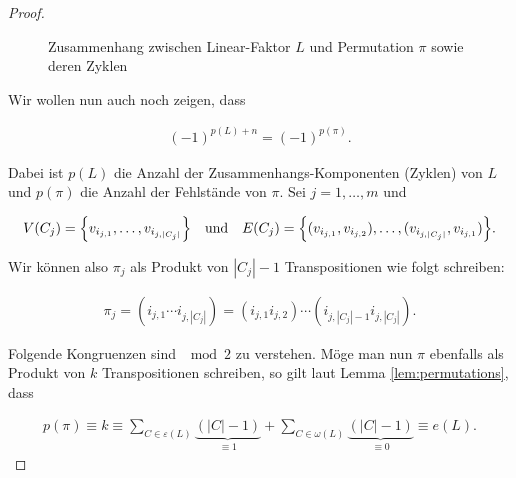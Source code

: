 \begin{proof}
\begin{figure}[h!]

                \caption{Zusammenhang zwischen Linear-Faktor $L$ und Permutation $\pi$ sowie deren Zyklen}
                \label{fig:pi_vs_L}
            \end{figure}

            Wir wollen nun auch noch zeigen, dass

            \begin{align} \label{eq:signs}
                (-1)^{p(L) + n} = (-1)^{p(\pi)}.
            \end{align}

            Dabei ist $p(L)$ die Anzahl der Zusammenhangs-Komponenten (Zyklen) von $L$ und $p(\pi)$ die Anzahl der Fehlstände von $\pi$.
            Sei $j = 1, \dots, m$ und

            \begin{align*}
                V(C_j) = {\left \{ v_{i_{j, 1}}, \dots, v_{i_{j, |C_j|}} \right \}}
                \quad
                \text{und}
                \quad
                E(C_j) = {\left \{ (v_{i_{j, 1}}, v_{i_{j, 2}}), \dots, (v_{i_{j, |C_j|}}, v_{i_{j, 1}}) \right \}}.
            \end{align*}

            Wir können also $\pi_j$ als Produkt von $|C_j| - 1$ Transpositionen wie folgt schreiben:

            \begin{align*}
                \pi_j
                =
                (i_{j, 1} \cdots i_{j, |C_j|})
                =
                (i_{j, 1} i_{j, 2}) \cdots (i_{j, |C_j|-1} i_{j, |C_j|}).
            \end{align*}

            Folgende Kongruenzen sind $\mod 2$ zu verstehen.
            Möge man nun $\pi$ ebenfalls als Produkt von $k$ Transpositionen schreiben, so gilt laut Lemma \ref{lem:permutations}, dass

            \begin{align} \label{eq:mod_1}
                p(\pi)
                \equiv
                k
                \equiv
                \sum_{C \in \varepsilon(L)}
                    \underbrace
                    {
                        (|C| - 1)
                    }_{
                        \equiv 1
                    }
                +
                \sum_{C \in \omega(L)}
                    \underbrace
                    {
                        (|C| - 1)
                    }_{
                        \equiv 0
                    }
                \equiv
                e(L).
            \end{align}


\end{proof}
